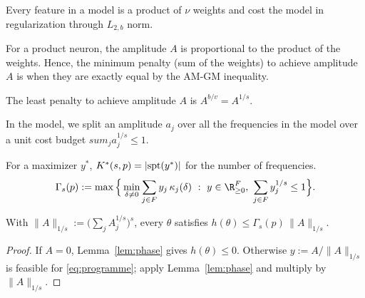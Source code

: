 Every feature in a model is a product of $\nu$ weights and cost the model in regularization through $L_{2, b}$ norm. 

For a product neuron, the amplitude $A$ is proportional to the product of the weights. Hence, the minimum penalty (sum of the weights) to achieve amplitude $A$ is when they are exactly equal by the AM-GM inequality. 

The least penalty to achieve amplitude $A$ is $A^{b/v}=A^{1/s}$.

In the model, we split an amplitude $a_j$ over all the frequencies in the model over a unit cost budget $sum_{j}a_{j}^{1/s}\le 1$.

For a maximizer $y^*$, $K^{*}(s,p)=|\mathrm{spt}(y^*)|$ for the number of frequencies.
\begin{equation}
  \Gamma_s(p):=\max\Big\{\min_{\delta\neq0}\sum_{j\in\Fp}y_j\,\cov{j}{\delta}\ :\ y\in\R_{\ge0}^{\Fp},\ \sum_{j\in\Fp}y_j^{1/s}\le1\Big\}.
  \label{eq:programme}
\end{equation}

\begin{proposition}\label{prop:coverage}
With $\|A\|_{1/s}:=\big(\sum_jA_j^{1/s}\big)^s$, every $\theta$ satisfies $h(\theta)\le\Gamma_s(p)\,\|A\|_{1/s}$.
\end{proposition}
\begin{proof}
If $A=0$, Lemma~\ref{lem:phase} gives $h(\theta)\le0$. Otherwise $y:=A/\|A\|_{1/s}$ is feasible for \eqref{eq:programme}; apply Lemma~\ref{lem:phase} and multiply by $\|A\|_{1/s}$.
\end{proof}

